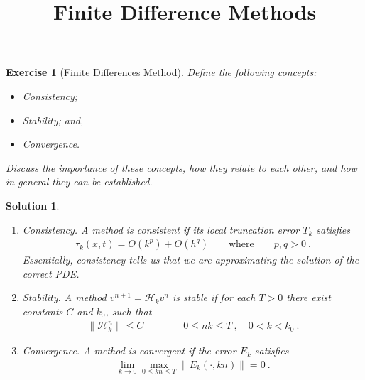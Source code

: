 \documentclass[10pt,letterpaper]{article}
\newcommand{\frb}[1]{ \left(  {#1} \right) }
\theoremstyle{break}
\newtheorem{exercise}{Exercise}
\newtheorem{mysolution}{Solution}
\newenvironment{solution}{\begin{mysolution}}{\end{mysolution}}
\begin{document}
\title{Finite Difference Methods}
\date{}











\begin{exercise}[Finite Differences Method]
	Define the following concepts:
	\begin{itemize}
	\item[(a)] Consistency;
	\item[(b)] Stability; and,
	\item[(c)] Convergence.
	\end{itemize}
	Discuss the importance of these concepts, how they relate to each other, and how in general they can be established.
\end{exercise}

\begin{solution}
	\begin{enumerate}
		\item
		{\textit{Consistency.}}\quad 
		A method is consistent if its local truncation error $T_k$ satisfies 
		\begin{gather} 	
		\tau_k(x,t)=O\frb{k^p}+O\frb{h^q}
		\qquad
		\text{where}\qquad p,q>0\ . 
		\end{gather} 
		Essentially, consistency tells us that we are approximating the solution of the correct PDE. 
		
		\item
		{\textit{Stability.}}\quad 
		A method $v^{n+1}=\mathcal{H}_kv^n$ is stable if for each $T>0$ there exist constants $C$ and $k_0$, such that 
		\begin{gather} 	
			\|\mathcal{H}_k^n\|\le C \qquad\qquad 0\le 
		nk\le T\ , \quad 0<k<k_0\ . 
		\end{gather}
		
		\item
		{\textit{Convergence.}}\quad
		A method is convergent if the error $E_k$ satisfies 
		\begin{gather} 	
			\lim_{k\to0} \max_{0\le kn\le T}\|E_k\frb{\cdot,kn}\| = 0 \ . 
		\end{gather} 
	\end{enumerate}
\end{solution}
\end{document}
